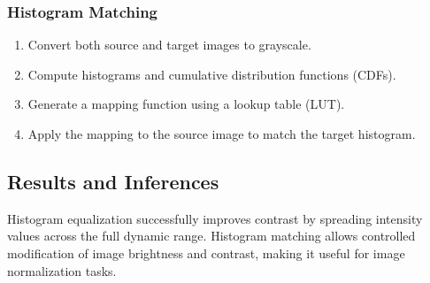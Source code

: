 \documentclass[12pt,a4paper]{article}
\begin{document}
\subsubsection{Histogram Matching}
\begin{enumerate}
  \item Convert both source and target images to grayscale.
  \item Compute histograms and cumulative distribution functions (CDFs).
  \item Generate a mapping function using a lookup table (LUT).
  \item Apply the mapping to the source image to match the target histogram.
\end{enumerate}

\subsection{Results and Inferences}
Histogram equalization successfully improves contrast by spreading intensity values across the full dynamic range. Histogram matching allows controlled modification of image brightness and contrast, making it useful for image normalization tasks.
\end{document}
